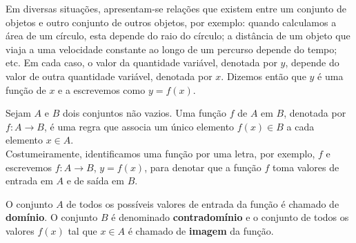 \documentclass[../main.tex]{subfiles}
\begin{document}
Em diversas situações, apresentam-se relações que existem entre um conjunto de objetos e outro conjunto de outros objetos, por exemplo: quando calculamos a área de um círculo, esta depende do raio do círculo; a distância de um objeto que viaja a uma velocidade constante ao longo de um percurso depende do tempo; etc. Em cada caso, o valor da quantidade variável, denotada por \(y\), depende do valor de outra quantidade variável, denotada por \(x\). Dizemos então que \(y\) é uma função de \(x\) e a escrevemos como \(y=f(x)\).


\begin{framed}
\begin{definition}
Sejam \(A\) e \(B\) dois conjuntos não vazios. Uma função \(f\) de \(A\) em \(B\), denotada por \(f:A\rightarrow B\), é uma regra que associa um único elemento \(f(x)\in B\) a cada elemento \(x\in A\).
\\ Costumeiramente, identificamos uma função por uma letra, por exemplo, $f$ e escrevemos $f:A\to B$, $y=f(x)$, para denotar que a função $f$ toma valores de entrada em $A$ e de saída em $B$.
\end{definition}
\end{framed}

O conjunto $A$ de todos os possíveis valores de entrada da função é chamado de \textbf{domínio}. O conjunto $B$ é denominado \textbf{contradomínio} e o conjunto de todos os valores $f(x)$ tal que $x\in A$ é chamado de \textbf{imagem} da função.

\end{document}
